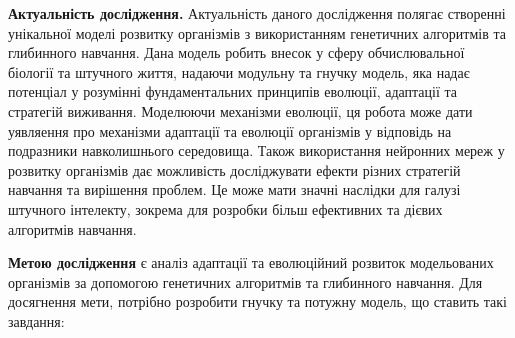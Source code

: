 \textbf{Актуальність дослідження.} 
Актуальність даного дослідження полягає
створенні унікальної моделі розвитку організмів з
використанням генетичних алгоритмів та глибинного навчання.
Дана модель робить внесок у сферу обчислювальної біології та штучного життя,
надаючи модульну та гнучку модель, яка надає потенціал у розумінні
фундаментальних принципів еволюції, адаптації та стратегій виживання.
Моделюючи механізми еволюції, ця робота може дати уявляення про механізми
адаптації та еволюції організмів у відповідь на подразники навколишнього середовища.
Також використання нейронних мереж у розвитку організмів дає можливість
досліджувати ефекти різних стратегій навчання та вирішення проблем.
Це може мати значні наслідки для галузі штучного інтелекту, 
зокрема для розробки більш ефективних та дієвих алгоритмів навчання.









\textbf{Метою дослідження} є
аналіз адаптації та еволюційний розвиток модельованих організмів 
за допомогою генетичних алгоритмів та глибинного навчання.
Для досягнення мети, потрібно розробити гнучку та потужну модель,
що ставить такі завдання:


